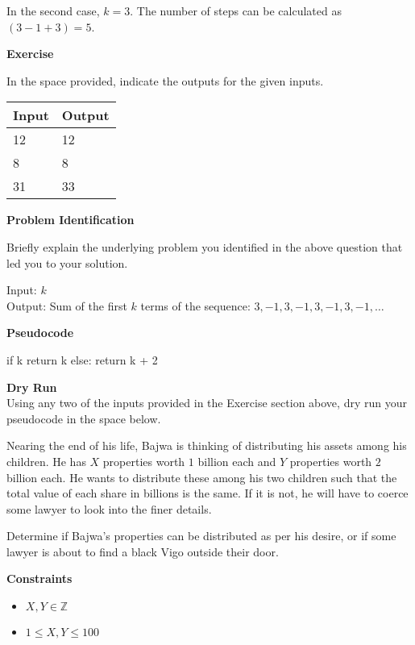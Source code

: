 \documentclass[a4paper]{exam}
\newcommand\heading[1]{\textbf{#1}}
\newcommand\inz{\in \mathbb{Z}}
\begin{document}
\begin{questions}
    In the second case, $k = 3$. The number of steps can be calculated as $(3-1+3)= 5$.

    \heading{Exercise}

    In the space provided, indicate the outputs for the given inputs.

    \begin{tabularx}{\textwidth}{|X|X|}
        \rowcolor{gray!50}
        \hline
        Input & Output \\ \hline\hline
        12    & 12     \\\hline
        8     & 8      \\\hline
        31     & 33      \\\hline
    \end{tabularx}

    \heading{Problem Identification}
    
    Briefly explain the underlying problem you identified in the above question that led you to your solution.

    \begin{mdframed}
      Input: $k$\\
      Output: Sum of the first $k$ terms of the sequence: $3, -1, 3, -1, 3, -1, 3, -1, \ldots $
    \end{mdframed}

    \heading{Pseudocode}
\begin{python}
if k %
    return k
else:
    return k + 2
\end{python}

    \heading{Dry Run}\\
    Using any two of the inputs provided in the Exercise section above, dry run your pseudocode in the space below.
    \vspace*{100pt}

      Nearing the end of his life, Bajwa is thinking of distributing his assets among his children. He has $X$ properties worth $1$ billion each and $Y$ properties worth $2$ billion each. He wants to distribute these among his two children such that the total value of each share in billions is the same. If it is not, he will have to coerce some lawyer to look into the finer details.

      Determine if Bajwa's properties can be distributed as per his desire, or if some lawyer is about to find a black Vigo outside their door.

    \heading{Constraints}
    \begin{itemize}
        \item $X,Y \inz$
        \item $1 \le X,Y \le 100$
    \end{itemize}


\end{questions}
\end{document}

